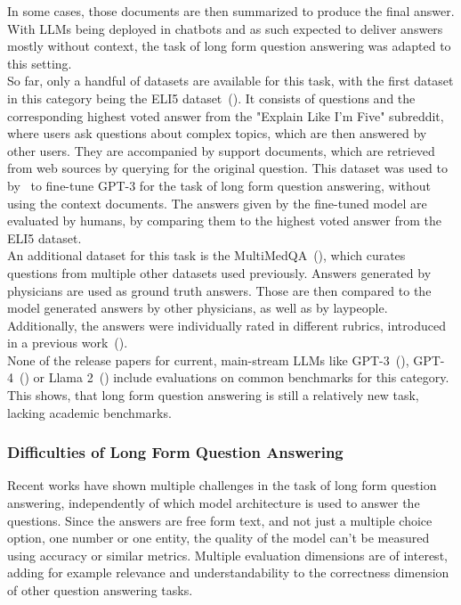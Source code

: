In some cases, those documents are then summarized to produce the final answer.
With LLMs being deployed in chatbots and as such expected to deliver answers mostly without context, the task of long form question answering was adapted to this setting.
\\
So far, only a handful of datasets are available for this task, with the first dataset in this category being the ELI5 dataset~(\cite{fan:2019}).
It consists of questions and the corresponding highest voted answer from the "Explain Like I'm Five" subreddit, where users ask questions about complex topics, which are then answered by other users.
They are accompanied by support documents, which are retrieved from web sources by querying for the original question.
This dataset was used to by~\cite{nakano:2021} to fine-tune GPT-3 for the task of long form question answering, without using the context documents.
The answers given by the fine-tuned model are evaluated by humans, by comparing them to the highest voted answer from the ELI5 dataset.
\\ 
An additional dataset for this task is the MultiMedQA~(\cite{singhal:2023}), which curates questions from multiple other datasets used previously. 
Answers generated by physicians are used as ground truth answers.
Those are then compared to the model generated answers by other physicians, as well as by laypeople.
Additionally, the answers were individually rated in different rubrics, introduced in a previous work~(\cite{singhal:2022}).
\\
None of the release papers for current, main-stream LLMs like GPT-3~(\cite{brown:2020}), GPT-4~(\cite{openai:2023}) or Llama 2~(\cite{touvron:2023}) include evaluations on common benchmarks for this category.
This shows, that long form question answering is still a relatively new task, lacking academic benchmarks.

\subsubsection{Difficulties of Long Form Question Answering}\label{sec:long-form-qa-difficulties}

Recent works have shown multiple challenges in the task of long form question answering, independently of which model architecture is used to answer the questions.
Since the answers are free form text, and not just a multiple choice option, one number or one entity, the quality of the model can't be measured using accuracy or similar metrics.
Multiple evaluation dimensions are of interest, adding for example relevance and understandability to the correctness dimension of other question answering tasks.
\\\\  

